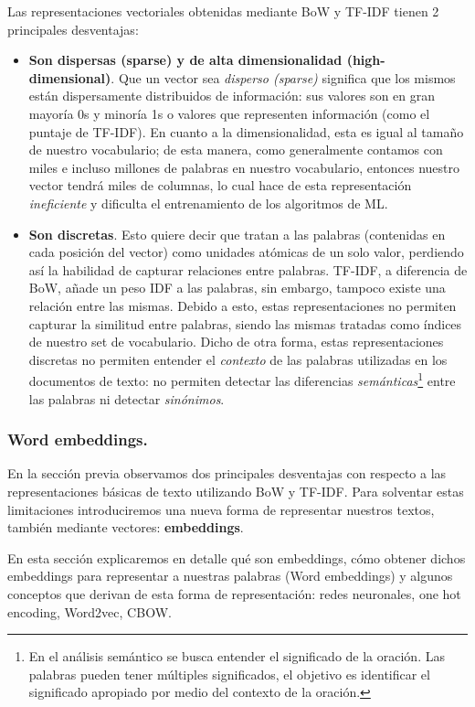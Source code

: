\documentclass[12pt,a4paper]{article}
\begin{document}
\begin{sloppypar}
Las representaciones vectoriales obtenidas mediante BoW y TF-IDF tienen 2 principales desventajas\cite{NLP_26, NLP_2}: 
\begin{itemize}
\item \textbf{Son dispersas (sparse) y de alta dimensionalidad (high-dimensional)}. Que un vector sea \textit{disperso (sparse)} significa que los mismos están dispersamente distribuidos de información: sus valores son en gran mayoría 0s y minoría 1s o valores que representen información (como el puntaje de TF-IDF). En cuanto a la dimensionalidad, esta es igual al tamaño de nuestro vocabulario; de esta manera, como generalmente contamos con miles e incluso millones de palabras en nuestro vocabulario, entonces nuestro vector tendrá miles de columnas, lo cual hace de esta representación \textit{ineficiente} y dificulta el entrenamiento de los algoritmos de ML. 
\item \textbf{Son discretas}. Esto quiere decir que tratan a las palabras (contenidas en cada posición del vector) como unidades atómicas de un solo valor, perdiendo así la habilidad de capturar relaciones entre palabras. TF-IDF, a diferencia de BoW, añade un peso IDF a las palabras, sin embargo, tampoco existe una relación entre las mismas. Debido a esto, estas representaciones no permiten capturar la similitud entre palabras, siendo las mismas tratadas como índices de nuestro set de vocabulario. Dicho de otra forma, estas representaciones discretas no permiten entender el \textit{contexto} de las palabras utilizadas en los documentos de texto: no permiten detectar las diferencias \textit{semánticas}\footnote{En el análisis semántico se busca entender el significado de la oración. Las palabras pueden tener múltiples significados, el objetivo es identificar el significado apropiado por medio del contexto de la oración.} entre las palabras ni detectar \textit{sinónimos}. 
\end{itemize}

\cleardoublepage

\subsubsection{Word embeddings.}\label{word_emb}
En la sección previa observamos dos principales desventajas con respecto a las representaciones básicas de texto utilizando BoW y TF-IDF. Para solventar estas limitaciones introduciremos una nueva forma de representar nuestros textos, también mediante vectores: \textbf{embeddings}. 

En esta sección explicaremos en detalle qué son embeddings, cómo obtener dichos embeddings para representar a nuestras palabras (Word embeddings) y algunos conceptos que derivan de esta forma de representación: redes neuronales, one hot encoding, Word2vec, CBOW.


\end{sloppypar}
\end{document}
